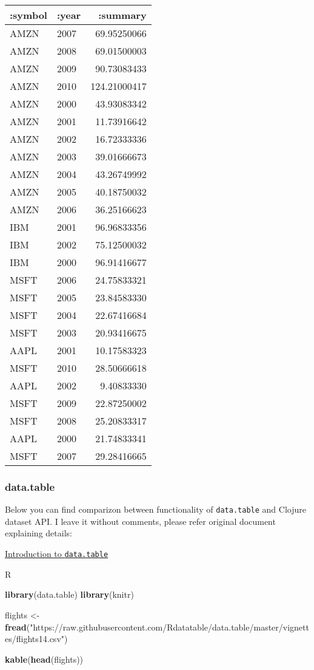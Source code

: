 \documentclass[]{article}
\newenvironment{Shaded}{\begin{snugshade}}{\end{snugshade}}
\newcommand{\KeywordTok}[1]{\textcolor[rgb]{0.13,0.29,0.53}{\textbf{#1}}}
\newcommand{\StringTok}[1]{\textcolor[rgb]{0.31,0.60,0.02}{#1}}
\newcommand{\NormalTok}[1]{#1}
\begin{document}
\begin{longtable}[]{@{}llr@{}}
\toprule
:symbol & :year & :summary\tabularnewline
\midrule
\endhead
AMZN & 2007 & 69.95250066\tabularnewline
AMZN & 2008 & 69.01500003\tabularnewline
AMZN & 2009 & 90.73083433\tabularnewline
AMZN & 2010 & 124.21000417\tabularnewline
AMZN & 2000 & 43.93083342\tabularnewline
AMZN & 2001 & 11.73916642\tabularnewline
AMZN & 2002 & 16.72333336\tabularnewline
AMZN & 2003 & 39.01666673\tabularnewline
AMZN & 2004 & 43.26749992\tabularnewline
AMZN & 2005 & 40.18750032\tabularnewline
AMZN & 2006 & 36.25166623\tabularnewline
IBM & 2001 & 96.96833356\tabularnewline
IBM & 2002 & 75.12500032\tabularnewline
IBM & 2000 & 96.91416677\tabularnewline
MSFT & 2006 & 24.75833321\tabularnewline
MSFT & 2005 & 23.84583330\tabularnewline
MSFT & 2004 & 22.67416684\tabularnewline
MSFT & 2003 & 20.93416675\tabularnewline
AAPL & 2001 & 10.17583323\tabularnewline
MSFT & 2010 & 28.50666618\tabularnewline
AAPL & 2002 & 9.40833330\tabularnewline
MSFT & 2009 & 22.87250002\tabularnewline
MSFT & 2008 & 25.20833317\tabularnewline
AAPL & 2000 & 21.74833341\tabularnewline
MSFT & 2007 & 29.28416665\tabularnewline
\bottomrule
\end{longtable}

\subsubsection{data.table}\label{data.table}

Below you can find comparizon between functionality of
\texttt{data.table} and Clojure dataset API. I leave it without
comments, please refer original document explaining details:

\href{https://rdatatable.gitlab.io/data.table/articles/datatable-intro.html}{Introduction
to \texttt{data.table}}

R

\begin{Shaded}
\begin{Highlighting}[]
\KeywordTok{library}\NormalTok{(data.table)}
\KeywordTok{library}\NormalTok{(knitr)}

\NormalTok{flights <-}\StringTok{ }\KeywordTok{fread}\NormalTok{(}\StringTok{"https://raw.githubusercontent.com/Rdatatable/data.table/master/vignettes/flights14.csv"}\NormalTok{)}

\KeywordTok{kable}\NormalTok{(}\KeywordTok{head}\NormalTok{(flights))}
\end{Highlighting}
\end{Shaded}
\end{document}
